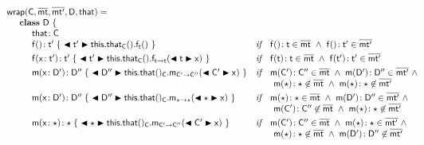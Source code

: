 \documentclass[acmlarge, anonymous, authordraft]{acmart}
\begin{document}
\begin{figure}[!ht]


\[
\begin{array}{@{}ll@{}l@{}r@{~}c@{~}r}
    \wrap\C\bmt\bmtp\D\that = \\
\SP \class ~\D ~ \{\\
\SPP \Fdef\that\C \\
\SPP \Mdefz\f{\tp}{~\bscast\tp{\Get{\Get\this\that\C}\f\t}~}
&    \textit{if}\,\,\,\,\,\, \Mtype\f{}\t\in\bmt ~\wedge~ \Mtype\f{}\tp \in \bmtp \\
\\[-3mm]
\SPP \Mdef\f\x\tp\tp {~\bscast\tp{\Set{\Get\this\that\C}\f\t{\bscast\t\x}}~}
&    \textit{if}\,\,\,\,\,\, \Mtype\f\t\t \in \bmt ~\wedge~ \Mtype\f\tp\tp \in \bmtp \\
\\[-3mm]
\SPP \Mdef\m\x\Dp\Dpp {~\bscast\Dpp{{\KCall{\this.\that()_{\C}} \m {\bscast{\Cp}\x}\Cp\Cpp }}~}
&     \textit{if}\,\,\,\,\,\, \Mtype\m\Cp\Cpp\in\bmt ~\wedge~ \Mtype\m\Dp\Dpp\in\bmtp ~\wedge~ \\
&     \multicolumn{5}{l}{\qquad \Mtype\m\any\any\not\in\bmt ~\wedge~ \Mtype\m\any\any\not\in\bmtp} \\
\\[-3mm]
\SPP \Mdef\m\x\Dp\Dpp{~\bscast\Dpp{\KCall{\this.\that()_{\C}} \m {\bscast\any\x}\any\any }~}
&    \textit{if}\,\,\,\,\,\, \Mtype\m\any\any\in\bmt ~\wedge~ \Mtype\m\Dp\Dpp\in\bmtp ~\wedge~  \\
&     \multicolumn{5}{l}{\qquad \Mtype\m\Cp\Cpp\not\in\bmt ~\wedge~  \Mtype\m\any\any\not\in\bmtp } \\
\\[-3mm]
\SPP \Mdef\m\x\any\any{~\bscast\any{\KCall{\this.\that()_{\C}}\m{\bscast{\Cp}\x}\Cp\Cpp}~}
&    \textit{if}\,\,\,\,\,\, \Mtype\m\Cp\Cpp\in\bmt ~\wedge~ \Mtype\m\any\any\in\bmtp ~\wedge~   \\
&     \multicolumn{5}{l}{\qquad \Mtype\m\any\any\not\in\bmt ~\wedge~  \Mtype\m\Dp\Dpp\not\in\bmtp } \\

\end{array}\]
\end{figure}
\end{document}
